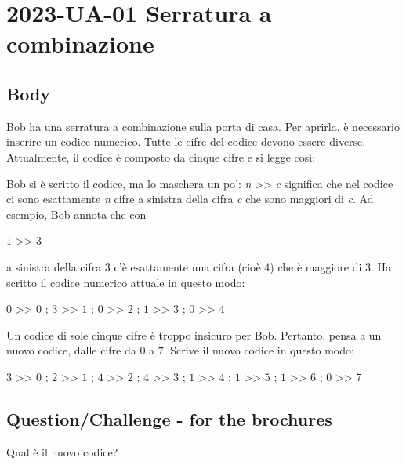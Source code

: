 \documentclass[a4paper,11pt]{report}
\newcommand{\taskGraphicsFolder}{..}
\begin{document}
\section*{\centering{} 2023-UA-01 Serratura a combinazione}


\subsection*{Body}

Bob ha una serratura a combinazione sulla porta di casa.
Per aprirla, è necessario inserire un codice numerico.
Tutte le cifre del codice devono essere diverse.
Attualmente, il codice è composto da cinque cifre e si legge così:

{\centering%
\par}

Bob si è scritto il codice, ma lo maschera un po’:
\emph{n} >\textcompwordmark{}> \emph{c} significa che nel codice ci sono esattamente \emph{n} cifre a sinistra della cifra \emph{c}
che sono maggiori di \emph{c}.  Ad esempio, Bob annota che con

$1$ >\textcompwordmark{}> 3

a sinistra della cifra $3$ c’è esattamente una cifra (cioè $4$) che è maggiore di $3$.
Ha scritto il codice numerico attuale in questo modo:

$0$ >\textcompwordmark{}> $0$ ; $3$ >\textcompwordmark{}> $1$ ; $0$ >\textcompwordmark{}> $2$ ; $1$ >\textcompwordmark{}> $3$ ; $0$ >\textcompwordmark{}> 4

Un codice di sole cinque cifre è troppo insicuro per Bob.
Pertanto, pensa a un nuovo codice, dalle cifre da $0$ a $7$.
Scrive il nuovo codice in questo modo:

$3$ >\textcompwordmark{}> $0$ ; $2$ >\textcompwordmark{}> $1$ ; $4$ >\textcompwordmark{}> $2$ ; $4$ >\textcompwordmark{}> $3$ ; $1$ >\textcompwordmark{}> $4$ ; $1$ >\textcompwordmark{}> $5$ ; $1$ >\textcompwordmark{}> $6$ ; $0$ >\textcompwordmark{}> 7

{\em


\subsection*{Question/Challenge - for the brochures}

Qual è il nuovo codice?

{\centering%
\par}

}
\end{document}
